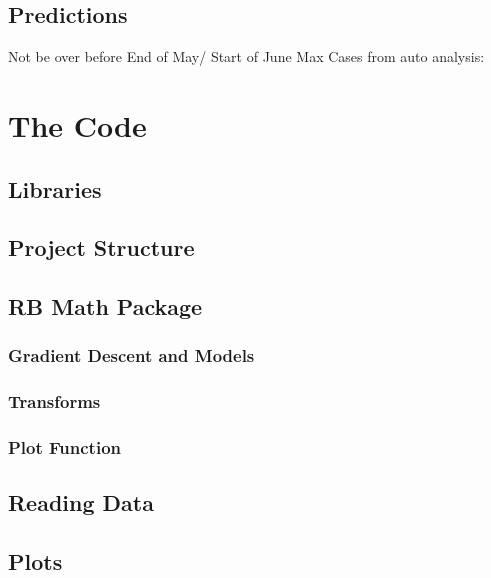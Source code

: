 \documentclass{report}
\begin{document}
        \subsection{Predictions}
            Not be over before End of May/ Start of June
            \newline
            Max Cases from auto analysis:
    \section{The Code}
        \subsection{Libraries}
        \subsection{Project Structure}
        \subsection{RB Math Package}
            \subsubsection{Gradient Descent and Models}
            \subsubsection{Transforms}
            \subsubsection{Plot Function}
        \subsection{Reading Data}
        \subsection{Plots}
\end{document}
